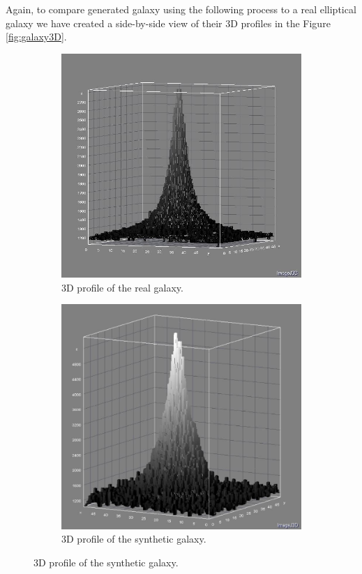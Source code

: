 Again, to compare generated galaxy using the following process to a real elliptical galaxy we have created a side-by-side view of their 3D profiles in the Figure \ref{fig:galaxy3D}.

\begin{figure}[!h]
\centering
    \begin{subfigure}[t]{.4\textwidth}
        \centering
        \includegraphics[width=\textwidth]{images/realGalaxy3D.JPG}
        \caption{3D profile of the real galaxy.}
        \label{fig:galaxy3D1}
    \end{subfigure}
    \begin{subfigure}[t]{.4\textwidth}
        \centering
        \includegraphics[width=\textwidth]{images/syngalaxy3D2.JPG}
        \caption{3D profile of the synthetic galaxy.}
        \label{fig:galaxy3D2}
    \end{subfigure}


\end{figure}
